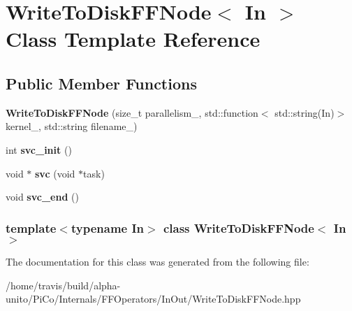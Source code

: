 \hypertarget{class_write_to_disk_f_f_node}{\section{\-Write\-To\-Disk\-F\-F\-Node$<$ \-In $>$ \-Class \-Template \-Reference}
\label{class_write_to_disk_f_f_node}
}
\subsection*{\-Public \-Member \-Functions}
\begin{DoxyCompactItemize}
\item 
\hypertarget{class_write_to_disk_f_f_node_adf7eda6a326a0113d27141dcc8db0cff}{{\bfseries \-Write\-To\-Disk\-F\-F\-Node} (size\-\_\-t parallelism\-\_\-, std\-::function$<$ std\-::string(\-In)$>$ kernel\-\_\-, std\-::string filename\-\_\-)}\label{class_write_to_disk_f_f_node_adf7eda6a326a0113d27141dcc8db0cff}

\item 
\hypertarget{class_write_to_disk_f_f_node_adbb0f820e3e4168e3881e57e6fffb047}{int {\bfseries svc\-\_\-init} ()}\label{class_write_to_disk_f_f_node_adbb0f820e3e4168e3881e57e6fffb047}

\item 
\hypertarget{class_write_to_disk_f_f_node_abfac53a07fd79196f8f84acc05f14122}{void $\ast$ {\bfseries svc} (void $\ast$task)}\label{class_write_to_disk_f_f_node_abfac53a07fd79196f8f84acc05f14122}

\item 
\hypertarget{class_write_to_disk_f_f_node_a6c3c04a03f899fd788ebd5895c1f42cc}{void {\bfseries svc\-\_\-end} ()}\label{class_write_to_disk_f_f_node_a6c3c04a03f899fd788ebd5895c1f42cc}

\end{DoxyCompactItemize}
\subsubsection*{template$<$typename \-In$>$ class Write\-To\-Disk\-F\-F\-Node$<$ In $>$}



\-The documentation for this class was generated from the following file\-:\begin{DoxyCompactItemize}
\item 
/home/travis/build/alpha-\/unito/\-Pi\-Co/\-Internals/\-F\-F\-Operators/\-In\-Out/\-Write\-To\-Disk\-F\-F\-Node.\-hpp\end{DoxyCompactItemize}
